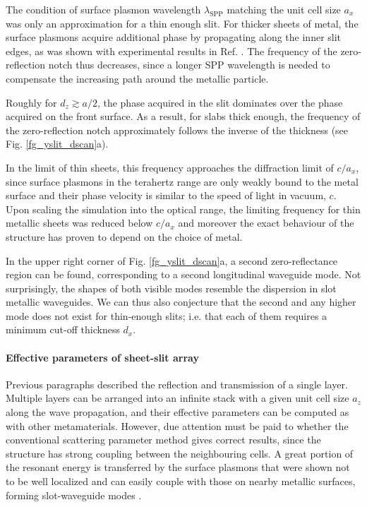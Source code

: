 The condition of surface plasmon wavelength $\lambda_{\text{SPP}}$ matching the unit cell size $a_x$ was only an approximation for a thin enough slit. For thicker sheets of metal, the surface plasmons acquire additional phase by propagating along the inner slit edges, as was shown with experimental results in Ref. \cite{weiner2011electromagnetics}. The frequency of the zero-reflection notch thus decreases, since a longer SPP wavelength is needed to compensate the increasing path around the metallic particle. 

Roughly for $d_z \gtrsim a/2$, the phase acquired in the slit dominates over the phase acquired on the front surface. As a result, 
for slabs thick enough, the frequency of the zero-reflection notch approximately follows the inverse of the thickness (see Fig. \ref{fg_yslit_dscan}a). 

In the limit of thin sheets, this frequency approaches the diffraction limit of $c/a_x$, since surface plasmons in the terahertz range are only weakly bound to the metal surface and their phase velocity is similar to the speed of light in vacuum, $c$. Upon scaling the simulation into the optical range, the limiting frequency for thin metallic sheets was reduced below $c/a_x$ and moreover the exact behaviour of the structure has proven to depend on the choice of metal.

In the upper right corner of Fig. \ref{fg_yslit_dscan}a, a second zero-reflectance region can be found, corresponding to a second longitudinal waveguide mode. Not surprisingly, the shapes of both visible modes resemble the dispersion in slot metallic waveguides. We can thus also conjecture that the second and any higher mode does not exist for thin-enough slits; i.e. that each of them requires a minimum cut-off thickness $d_x$.

\paragraph{Effective parameters of sheet-slit array}%
Previous paragraphs described the reflection and transmission of a single layer. Multiple layers can be arranged into an infinite stack with a given unit cell size $a_z$ along the wave propagation, and their effective parameters can be computed as with other metamaterials. However, due attention must be paid to whether the conventional scattering parameter method gives correct results, since the structure has strong coupling between the neighbouring cells. A great portion of the resonant energy is transferred by the surface plasmons that were shown not to be well localized and can easily couple with those on nearby metallic surfaces, forming slot-waveguide modes \cite{weiner2011electromagnetics}.

